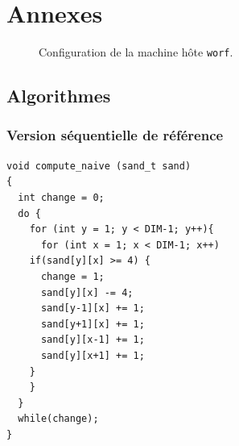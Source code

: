\section*{Annexes}


\begin{figure}[!ht]
  \caption{Configuration de la machine hôte \texttt{worf}.}
  \label{fig:lstopo}
\end{figure}

\clearpage
\subsection*{Algorithmes}

\subsubsection*{Version séquentielle de référence}
\label{algo:naif}

\begin{verbatim}
void compute_naive (sand_t sand)
{
  int change = 0;
  do {
    for (int y = 1; y < DIM-1; y++){
      for (int x = 1; x < DIM-1; x++)
	if(sand[y][x] >= 4) {
	  change = 1;
	  sand[y][x] -= 4;
	  sand[y-1][x] += 1;
	  sand[y+1][x] += 1;
	  sand[y][x-1] += 1;
	  sand[y][x+1] += 1;
	}
    }
  }
  while(change);
}
\end{verbatim}
